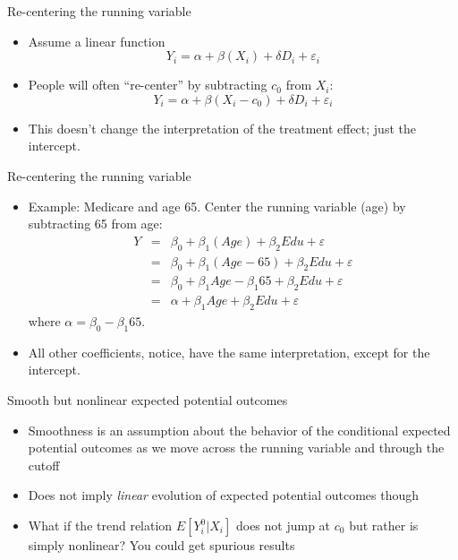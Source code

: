 \documentclass{beamer}
\begin{document}
\begin{frame}{Re-centering the running variable}
	
	\begin{itemize}
	\item Assume a linear function $$Y_i = \alpha + \beta(X_i) + \delta D_i + \varepsilon_i$$
	\item People will often ``re-center'' by subtracting $c_0$ from $X_i$:$$Y_i=\alpha + \beta(X_i-c_0) + \delta D_i +\varepsilon_i$$
	\item This doesn't change the interpretation of the treatment effect; just the intercept.
	\end{itemize}

\end{frame}



\begin{frame}{Re-centering the running variable}

\begin{itemize}
	\item Example: Medicare and age 65.  Center the running variable (age) by subtracting 65 from age:
		\begin{eqnarray*}
		Y &=& \beta_0 + \beta_1(Age) + \beta_2 Edu + \varepsilon \\
		&=& \beta_0 + \beta_1(Age-65) + \beta_2 Edu + \varepsilon\\
		&=& \beta_0 + \beta_1 Age - \beta_1 65 + \beta_2 Edu+ \varepsilon \\
		&=& \alpha + \beta_1 Age + \beta_2 Edu+ \varepsilon
		\end{eqnarray*}where $\alpha=\beta_0 - \beta_1 65$.  
		\item All other coefficients, notice, have the same interpretation, except for the intercept.
\end{itemize}

\end{frame}


\begin{frame}{Smooth but nonlinear expected potential outcomes}
	
	\begin{itemize}
	\item Smoothness is an assumption about the behavior of the conditional expected potential outcomes as we move across the running variable and through the cutoff
	\item Does not imply \emph{linear} evolution of expected potential outcomes though
	\item What if the trend relation $E[Y_i^0 | X_i]$ does not jump at $c_0$ but rather is simply nonlinear?  You could get spurious results
	\end{itemize}

\end{frame}
\end{document}
